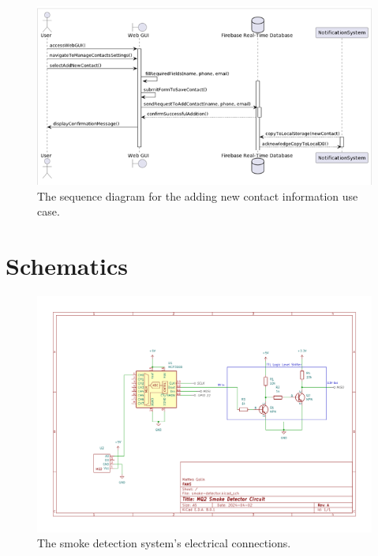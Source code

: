 \begin{figure}[H]
    \centering
    \includegraphics[width=\imagewidth]{../assets/sequence/AddingNewContactInformationSequenceDiagram.png}
    \caption{The sequence diagram for the adding new contact information use case.}
    \label{fig:add-contact}
\end{figure}

\section{Schematics}

\begin{figure}[H]
    \centering
    \includegraphics[width=5in]{../assets/schematics/MQ2-Schematic-Final.png}
    \caption{The smoke detection system's electrical connections.}
\end{figure}

